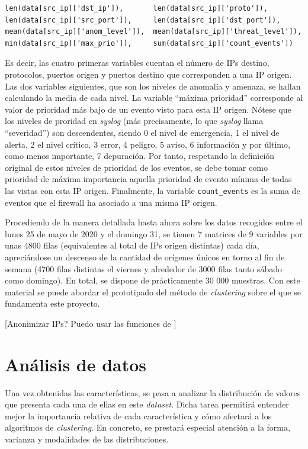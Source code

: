 \begin{verbatim}
len(data[src_ip]['dst_ip']),       len(data[src_ip]['proto']),
len(data[src_ip]['src_port']),     len(data[src_ip]['dst_port']),
mean(data[src_ip]['anom_level']),  mean(data[src_ip]['threat_level']),
min(data[src_ip]['max_prio']),     sum(data[src_ip]['count_events'])
\end{verbatim}

Es decir, las cuatro primeras variables cuentan el número de IPs destino, protocolos, puertos origen y puertos destino que corresponden a una IP origen.
Las dos variables siguientes, que son los niveles de anomalía y amenaza, se hallan calculando la media de cada nivel.
La variable ``máxima prioridad'' corresponde al valor de prioridad más bajo de un evento visto para esta IP origen.
Nótese que los niveles de proridad en \emph{syslog} (más precisamente, lo que \emph{syslog} llama ``severidad'') son descendentes,
siendo 0 el nivel de emergencia, 1 el nivel de alerta, 2 el nivel crítico, 3 error, 4 peligro, 5 aviso, 6 información y por último, como menos importante, 7 depuración.
Por tanto, respetando la definición original de estos niveles de prioridad de los eventos,
se debe tomar como prioridad de máxima importancia aquella prioridad de evento mínima de todas las vistas con esta IP origen.
Finalmente, la variable \texttt{count\_events} es la suma de eventos que el firewall ha asociado a una misma IP origen.

Procediendo de la manera detallada hasta ahora sobre los datos recogidos entre el lunes 25 de mayo de 2020 y el domingo 31,
se tienen 7 matrices de 9 variables por unas 4800 filas (equivalentes al total de IPs origen distintas) cada día,
apreciándose un descenso de la cantidad de orígenes únicos en torno al fin de semana
(4700 filas distintas el viernes y alrededor de 3000 filas tanto sábado como domingo).
En total, se dispone de prácticamente 30 000 muestras.
Con este material se puede abordar el prototipado del método de \emph{clustering} sobre el que se fundamenta este proyecto.

[Anonimizar IPs? Puedo usar las funciones de \cite{Labayen_2020}]

\section{Análisis de datos}\label{sec:analisisdedatos}

Una vez obtenidas las características, se pasa a analizar la distribución de valores que presenta cada una de ellas en este \emph{dataset}.
Dicha tarea permitirá entender mejor la importancia relativa de cada característica y cómo afectará a los algoritmos de \emph{clustering}.
En concreto, se prestará especial atención a la forma, varianza y modalidades de las distribuciones.

